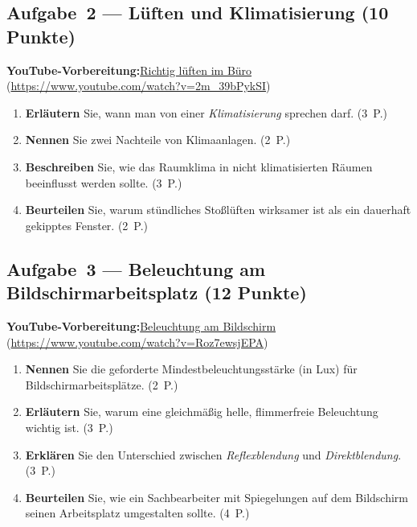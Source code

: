 \documentclass[11pt, a4paper]{article}
\begin{document}
\subsection*{Aufgabe~2 --- Lüften und Klimatisierung (10 Punkte)}

\noindent\textbf{\color{bfwAccent}YouTube-Vorbereitung:}\enspace \href{https://www.youtube.com/watch?v=2m_39bPykSI}{Richtig lüften im Büro} (\url{https://www.youtube.com/watch?v=2m_39bPykSI})

\medskip
\begin{enumerate}[label=(\alph*)]
  \item \textbf{Erläutern} Sie, wann man von einer \emph{Klimatisierung} sprechen darf. \hfill (3~P.)
  \item \textbf{Nennen} Sie zwei Nachteile von Klimaanlagen. \hfill (2~P.)
  \item \textbf{Beschreiben} Sie, wie das Raumklima in nicht klimatisierten Räumen beeinflusst werden sollte. \hfill (3~P.)
  \item \textbf{Beurteilen} Sie, warum stündliches Stoßlüften wirksamer ist als ein dauerhaft gekipptes Fenster. \hfill (2~P.)
\end{enumerate}

\subsection*{Aufgabe~3 --- Beleuchtung am Bildschirmarbeitsplatz (12 Punkte)}

\noindent\textbf{\color{bfwAccent}YouTube-Vorbereitung:}\enspace \href{https://www.youtube.com/watch?v=Roz7ewsjEPA}{Beleuchtung am Bildschirm} (\url{https://www.youtube.com/watch?v=Roz7ewsjEPA})

\medskip
\begin{enumerate}[label=(\alph*)]
  \item \textbf{Nennen} Sie die geforderte Mindestbeleuchtungsstärke (in Lux) für Bildschirmarbeitsplätze. \hfill (2~P.)
  \item \textbf{Erläutern} Sie, warum eine gleichmäßig helle, flimmerfreie Beleuchtung wichtig ist. \hfill (3~P.)
  \item \textbf{Erklären} Sie den Unterschied zwischen \emph{Reflexblendung} und \emph{Direktblendung}. \hfill (3~P.)
  \item \textbf{Beurteilen} Sie, wie ein Sachbearbeiter mit Spiegelungen auf dem Bildschirm seinen Arbeitsplatz umgestalten sollte. \hfill (4~P.)
\end{enumerate}
\end{document}
